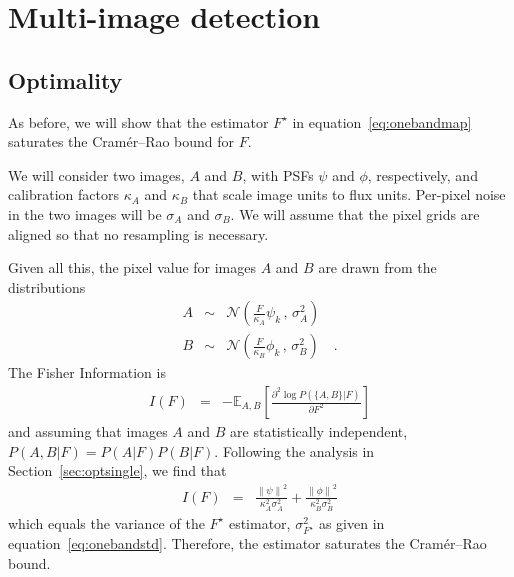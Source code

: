 \documentclass[11pt,letterpaper,linenumbers]{aastex7}
\newcommand{\equationname}{equation}
\newcommand{\eqnref}[1]{\mbox{\equationname~\ref{#1}}}
\newcommand{\secref}[1]{\mbox{Section~\ref{#1}}}
\newcommand{\drawnfrom}{\sim}
\newcommand{\gaussianN}{\mathcal{N}}
\newcommand{\gaussx}[2]{\gaussianN\!\left(#1 \, , \, #2\right)}
\newcommand{\norm}[1]{\left\lVert #1 \right\rVert}
\begin{document}
\section{Multi-image detection}
\label{app:multidet}

\subsection{Optimality}
\label{app:multiopt}
As before, we will show that the estimator $F^{\star}$ in
\eqnref{eq:onebandmap} saturates the Cram\'er--Rao bound for $F$.

We will consider two images, $A$ and $B$, with PSFs $\psi$ and $\phi$,
respectively, and calibration factors $\kappa_A$ and $\kappa_B$ that
scale image units to flux units.  Per-pixel noise in the two images
will be $\sigma_A$ and $\sigma_B$.  We will assume that the pixel
grids are aligned so that no resampling is necessary.

Given all this, the pixel value for images $A$ and $B$ are drawn from
the distributions
\begin{eqnarray}
  A & \drawnfrom & \gaussx{\frac{F}{\kappa_A} \psi_k}{\sigma_A^2} \\
  B & \drawnfrom & \gaussx{\frac{F}{\kappa_B} \phi_k}{\sigma_B^2}
  \quad .
\end{eqnarray}
The Fisher Information is
\begin{eqnarray}
  I(F) &=& -\mathbb{E}_{A,B} \left[ \frac{\partial^2 \log P(\{ A,B \} | F)}{\partial F^2} \right]
\end{eqnarray}
and assuming that images $A$ and $B$ are statistically independent,
$P(A,B | F) = P(A|F) P(B|F)$.  Following the analysis in
\secref{sec:optsingle}, we find that
\begin{eqnarray}
  I(F) &=& \frac{\norm{\psi}^2}{\kappa_A^2 \sigma_A^2} +
  \frac{\norm{\phi}^2}{\kappa_B^2 \sigma_B^2}
\end{eqnarray}
which equals the variance of the $F^{\star}$ estimator,
$\sigma_{F^{\star}}^2$ as given in \eqnref{eq:onebandstd}.
Therefore, the estimator saturates the Cram\'er--Rao bound.
\end{document}
